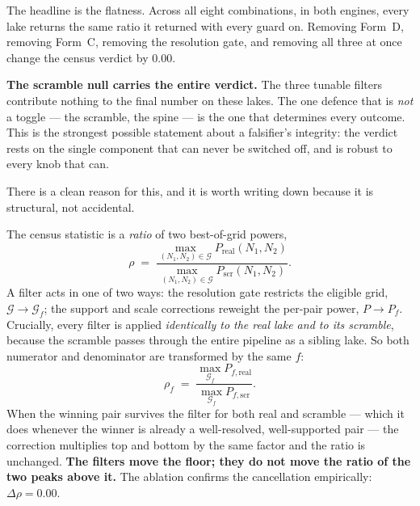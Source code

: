 \documentclass[11pt, letterpaper, openany]{book}
\begin{document}
The headline is the flatness. Across all eight combinations, in both engines, every lake returns the
same ratio it returned with every guard on. Removing Form~D, removing Form~C, removing the resolution
gate, and removing all three at once change the census verdict by $0.00$.

\begin{signalbox}
\textbf{The scramble null carries the entire verdict.} The three tunable filters contribute nothing to
the final number on these lakes. The one defence that is \emph{not} a toggle --- the scramble, the spine
--- is the one that determines every outcome. This is the strongest possible statement about a
falsifier's integrity: the verdict rests on the single component that can never be switched off, and is
robust to every knob that can.
\end{signalbox}

There is a clean reason for this, and it is worth writing down because it is structural, not accidental.

\begin{derivbox}
The census statistic is a \emph{ratio} of two best-of-grid powers,
\[
\rho \;=\; \frac{\displaystyle\max_{(N_1,N_2)\in\mathcal{G}} P_{\mathrm{real}}(N_1,N_2)}
                 {\displaystyle\max_{(N_1,N_2)\in\mathcal{G}} P_{\mathrm{scr}}(N_1,N_2)} .
\]
A filter acts in one of two ways: the resolution gate restricts the eligible grid,
$\mathcal{G}\to\mathcal{G}_f$; the support and scale corrections reweight the per-pair power,
$P\to P_f$. Crucially, every filter is applied \emph{identically to the real lake and to its scramble},
because the scramble passes through the entire pipeline as a sibling lake. So both numerator and
denominator are transformed by the same $f$:
\[
\rho_f \;=\; \frac{\displaystyle\max_{\mathcal{G}_f} P_{f,\mathrm{real}}}
                  {\displaystyle\max_{\mathcal{G}_f} P_{f,\mathrm{scr}}} .
\]
When the winning pair survives the filter for both real and scramble --- which it does whenever the
winner is already a well-resolved, well-supported pair --- the correction multiplies top and bottom by
the same factor and the ratio is unchanged. \textbf{The filters move the floor; they do not move the
ratio of the two peaks above it.} The ablation confirms the cancellation empirically: $\Delta\rho = 0.00$.
\end{derivbox}
\end{document}
